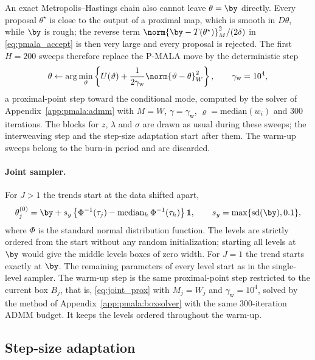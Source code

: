 An exact Metropolis--Hastings chain also cannot leave $\theta = \by$ directly. Every proposal $\theta^\star$ is close to the output of a proximal map, which is smooth in $D\theta$, while $\by$ is rough; the reverse term $\norm{\by - T(\theta^\star)}_M^2/(2\delta)$ in \eqref{eq:pmala_accept} is then very large and every proposal is rejected. The first $H = 200$ sweeps therefore replace the P-MALA move by the deterministic step
\[
\theta \leftarrow \arg\min_{\vartheta}\left\{U(\vartheta) + \frac{1}{2\gamma_{\mathrm{w}}}\norm{\vartheta - \theta}_W^2\right\}, \qquad \gamma_{\mathrm{w}} = 10^4,
\]
a proximal-point step toward the conditional mode, computed by the solver of Appendix~\ref{app:pmala:admm} with $M = W$, $\gamma = \gamma_{\mathrm{w}}$, $\varrho = \mathrm{median}(w_i)$ and $300$ iterations. The blocks for $z$, $\lambda$ and $\sigma$ are drawn as usual during these sweeps; the interweaving step and the step-size adaptation start after them. The warm-up sweeps belong to the burn-in period and are discarded.

\paragraph{Joint sampler.} For $J>1$ the trends start at the data shifted apart,
\[
    \theta_j^{(0)}=\by+s_y\left\{\Phi^{-1}(\tau_j)
                -\mathrm{median}_{h}\,\Phi^{-1}(\tau_h)\right\}\mathbf 1,
    \qquad s_y=\max\{\mathrm{sd}(\by),0.1\},
\]
where $\Phi$ is the standard normal distribution function. The levels are strictly ordered from the start without any random initialization; starting all levels at $\by$ would give the middle levels boxes of zero width. For $J=1$ the trend starts exactly at $\by$. The remaining parameters of every level start as in the single-level sampler. The warm-up step is the same proximal-point step restricted to the current box $B_j$, that is, \eqref{eq:joint_prox} with $M_j = W_j$ and $\gamma_{\mathrm{w}} = 10^4$, solved by the method of Appendix~\ref{app:pmala:boxsolver} with the same $300$-iteration ADMM budget. It keeps the levels ordered throughout the warm-up.

\subsection{Step-size adaptation}
\label{app:pmala:adapt}

